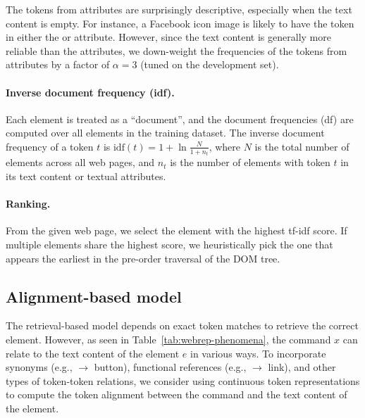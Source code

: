 The tokens from attributes are surprisingly descriptive,
especially when the text content is empty.
For instance, a Facebook icon image
is likely to have the token 
in either the  or  attribute.
However, since the text content is generally
more reliable than the attributes,
we down-weight the frequencies
of the tokens from attributes
by a factor of $\alpha = 3$ (tuned on the development set).

\paragraph{Inverse document frequency (idf).}
Each element is treated as a ``document'',
and the document frequencies (df) are computed
over all elements in the training dataset.
The inverse document frequency of a token $t$
is $\mathrm{idf}(t) = 1 + \ln\frac{N}{1 + n_t}$,
where $N$ is the total number of elements across all web pages,
and $n_t$ is the number of elements with token $t$
in its text content or textual attributes.

\paragraph{Ranking.}
From the given web page,
we select the element
with the highest tf-idf score.
If multiple elements share the highest score,
we heuristically pick the one that appears the earliest
in the pre-order traversal of the DOM tree.

\subsection{Alignment-based model}

The retrieval-based model depends on exact token matches
to retrieve the correct element.
However, as seen in Table~\ref{tab:webrep-phenomena},
the command $x$ can relate to the text content of the element $e$
in various ways.
To incorporate synonyms
(e.g.,  $\to$  button),
functional references
(e.g.,  $\to$
 link),
and other types of token-token relations,
we consider using continuous token representations
to compute the token alignment between the command
and the text content of the element.

